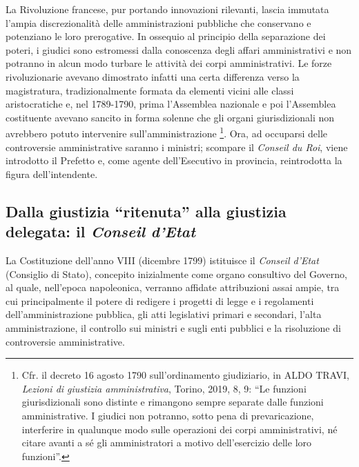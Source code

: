 \documentclass[12pt,it,a4paper,]{report}
\begin{document}
La Rivoluzione francese, pur portando innovazioni rilevanti, lascia
immutata l'ampia discrezionalità delle amministrazioni pubbliche che
conservano e potenziano le loro prerogative. In ossequio al principio
della separazione dei poteri, i giudici sono estromessi dalla conoscenza
degli affari amministrativi e non potranno in alcun modo turbare le
attività dei corpi amministrativi. Le forze rivoluzionarie avevano
dimostrato infatti una certa differenza verso la magistratura,
tradizionalmente formata da elementi vicini alle classi aristocratiche
e, nel 1789-1790, prima l'Assemblea nazionale e poi l'Assemblea
costituente avevano sancito in forma solenne che gli organi
giurisdizionali non avrebbero potuto intervenire sull'amministrazione
\footnote{Cfr. il decreto 16 agosto 1790 sull'ordinamento giudiziario,
  in ALDO TRAVI, \emph{Lezioni di giustizia amministrativa}, Torino,
  2019, 8, 9: ``Le funzioni giurisdizionali sono distinte e rimangono
  sempre separate dalle funzioni amministrative. I giudici non potranno,
  sotto pena di prevaricazione, interferire in qualunque modo sulle
  operazioni dei corpi amministrativi, né citare avanti a sé gli
  amministratori a motivo dell'esercizio delle loro funzioni''.}. Ora,
ad occuparsi delle controversie amministrative saranno i ministri;
scompare il \emph{Conseil du Roi}, viene introdotto il Prefetto e, come
agente dell'Esecutivo in provincia, reintrodotta la figura
dell'intendente.

\hypertarget{dalla-giustizia-ritenuta-alla-giustizia-delegata-il-conseil-detat}{%
\subsection{\texorpdfstring{Dalla giustizia ``ritenuta'' alla giustizia
delegata: il \emph{Conseil
d'Etat}}{Dalla giustizia ``ritenuta'' alla giustizia delegata: il Conseil d'Etat}}\label{dalla-giustizia-ritenuta-alla-giustizia-delegata-il-conseil-detat}}

La Costituzione dell'anno VIII (dicembre 1799) istituisce il
\emph{Conseil d'Etat} (Consiglio di Stato), concepito inizialmente come
organo consultivo del Governo, al quale, nell'epoca napoleonica,
verranno affidate attribuzioni assai ampie, tra cui principalmente il
potere di redigere i progetti di legge e i regolamenti
dell'amministrazione pubblica, gli atti legislativi primari e secondari,
l'alta amministrazione, il controllo sui ministri e sugli enti pubblici
e la risoluzione di controversie amministrative.
\end{document}
